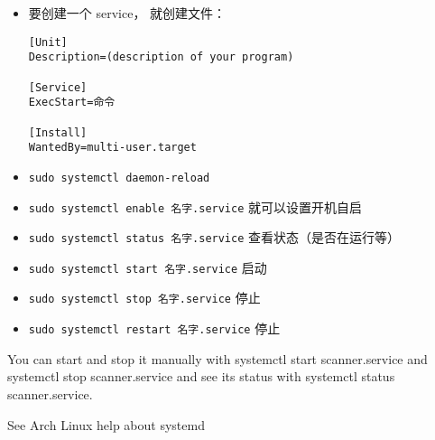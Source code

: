 
\begin{itemize}
\item 要创建一个 service， 就创建文件：
\begin{lstlisting}[language=none,caption=/etc/systemd/system/名字.service]
[Unit]
Description=(description of your program)

[Service]
ExecStart=命令

[Install]
WantedBy=multi-user.target
\end{lstlisting}
\item \verb|sudo systemctl daemon-reload|
\item \verb|sudo systemctl enable 名字.service| 就可以设置开机自启
\item \verb|sudo systemctl status 名字.service| 查看状态（是否在运行等）
\item \verb|sudo systemctl start 名字.service| 启动
\item \verb|sudo systemctl stop 名字.service| 停止
\item \verb|sudo systemctl restart 名字.service| 停止
\end{itemize}

You can start and stop it manually with systemctl start scanner.service and systemctl stop scanner.service and see its status with systemctl status scanner.service.

See Arch Linux help about systemd